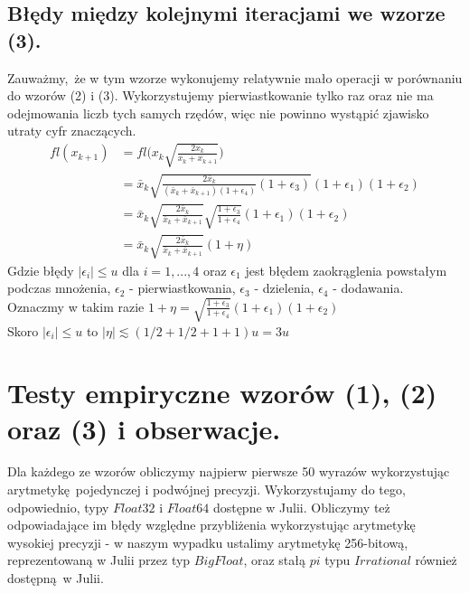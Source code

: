 \documentclass[10pt,wide]{mwart}
\theoremstyle{definition}
\begin{document}
\subsection{Błędy między kolejnymi iteracjami we wzorze (3).}
Zauważmy, że w tym wzorze wykonujemy relatywnie mało operacji w porównaniu do wzorów (2) i (3).
Wykorzystujemy pierwiastkowanie tylko raz oraz nie ma odejmowania liczb tych samych rzędów, więc nie powinno wystąpić zjawisko utraty cyfr znaczących.
\begin{equation*}
\begin{split}
fl(x_{k+1}) & = fl\bigg( x_k\sqrt{\frac{2x_k}{x_k + x_{k+1}}} \bigg) \\
& = \bar{x}_k\sqrt{\frac{2\bar{x}_k}{(\bar{x}_k + \bar{x}_{k+1})(1 + \epsilon_4)}(1+\epsilon_3)} (1 + \epsilon_1) (1 + \epsilon_2) \\
& = \bar{x}_k\sqrt{\frac{2\bar{x}_k}{\bar{x}_k + \bar{x}_{k+1}}}\sqrt{\frac{1 + \epsilon_3}{1 + \epsilon_4}}(1 + \epsilon_1) (1 + \epsilon_2) \\
& = \bar{x}_k\sqrt{\frac{2\bar{x}_k}{\bar{x}_k + \bar{x}_{k+1}}}(1 + \eta)
\end{split}
\end{equation*}
Gdzie błędy \(|\epsilon_i| \leq u \) dla \(i = 1,...,4\) oraz \(\epsilon_1\) jest błędem zaokrąglenia powstałym podczas mnożenia, \(\epsilon_2\) - pierwiastkowania, \(\epsilon_3\) - dzielenia, \(\epsilon_4\) - dodawania.
Oznaczmy w takim razie \( 1 + \eta = \sqrt{\frac{1 + \epsilon_3}{1 + \epsilon_4}}(1 + \epsilon_1) (1 + \epsilon_2) \)\\
Skoro \( |\epsilon_i | \leq u \) to \(|\eta| \lesssim (1/2 + 1/2 + 1 + 1 ) u = 3u \)

\section{Testy empiryczne wzorów (1), (2) oraz (3) i obserwacje.}
Dla każdego ze wzorów obliczymy najpierw pierwsze 50 wyrazów wykorzystując arytmetykę pojedynczej
i podwójnej precyzji. Wykorzystujamy do tego, odpowiednio, typy \(Float32\) i \(Float64\) dostępne w Julii.
Obliczymy też odpowiadające im błędy względne przybliżenia wykorzystując arytmetykę wysokiej precyzji - w naszym wypadku ustalimy arytmetykę
256-bitową, reprezentowaną w Julii przez typ \(BigFloat\), oraz stałą \(pi\) typu \(Irrational\) również dostępną w Julii.
\end{document}
